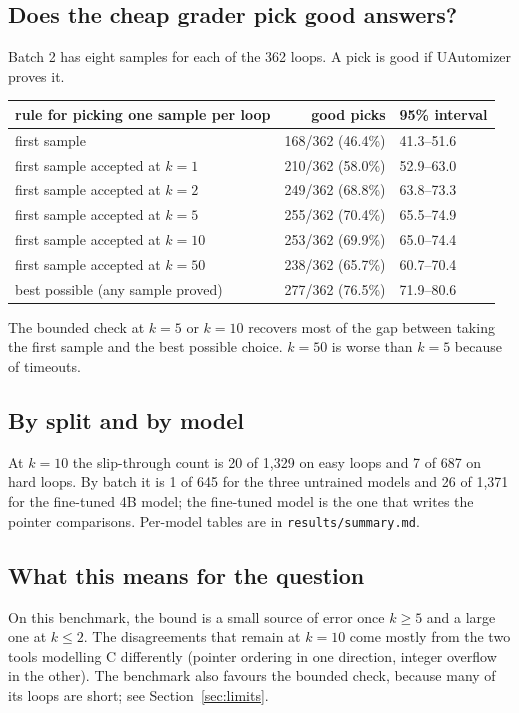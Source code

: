 \documentclass[11pt]{article}
\newcommand{\code}[1]{\texttt{#1}}
\begin{document}
\subsection{Does the cheap grader pick good answers?}

Batch 2 has eight samples for each of the 362 loops. A pick is good if UAutomizer proves it.

\begin{center}
\begin{tabular}{lrl}
\toprule
rule for picking one sample per loop & good picks & 95\% interval \\
\midrule
first sample & 168/362 (46.4\%) & 41.3--51.6 \\
first sample accepted at $k=1$ & 210/362 (58.0\%) & 52.9--63.0 \\
first sample accepted at $k=2$ & 249/362 (68.8\%) & 63.8--73.3 \\
first sample accepted at $k=5$ & 255/362 (70.4\%) & 65.5--74.9 \\
first sample accepted at $k=10$ & 253/362 (69.9\%) & 65.0--74.4 \\
first sample accepted at $k=50$ & 238/362 (65.7\%) & 60.7--70.4 \\
best possible (any sample proved) & 277/362 (76.5\%) & 71.9--80.6 \\
\bottomrule
\end{tabular}
\end{center}

\noindent The bounded check at $k=5$ or $k=10$ recovers most of the gap between taking the
first sample and the best possible choice. $k=50$ is worse than $k=5$ because of timeouts.

\subsection{By split and by model}

At $k=10$ the slip-through count is 20 of 1{,}329 on easy loops and 7 of 687 on hard loops. By
batch it is 1 of 645 for the three untrained models and 26 of 1{,}371 for the fine-tuned 4B
model; the fine-tuned model is the one that writes the pointer comparisons. Per-model tables
are in \code{results/summary.md}.

\subsection{What this means for the question}

On this benchmark, the bound is a small source of error once $k \ge 5$ and a large one at
$k \le 2$. The disagreements that remain at $k=10$ come mostly from the two tools modelling C
differently (pointer ordering in one direction, integer overflow in the other). The benchmark
also favours the bounded check, because many of its loops are short; see Section~\ref{sec:limits}.
\end{document}
